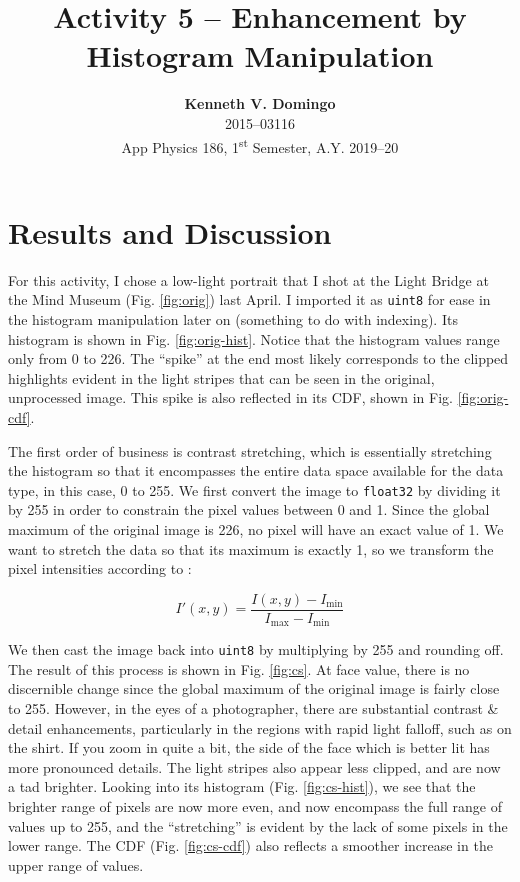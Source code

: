 \documentclass[12pt,a4paper]{article}
\begin{document}
\title{\TitleFont Activity 5 -- Enhancement by Histogram Manipulation}
\author[ ]{\textbf{Kenneth V. Domingo} \\
2015--03116 \\
App Physics 186, 1\textsuperscript{st} Semester, A.Y. 2019--20}

\maketitle
\thispagestyle{titlestyle}

\section*{Results and Discussion}
\setcounter{section}{1}

For this activity, I chose a low-light portrait that I shot at the Light Bridge at the Mind Museum (Fig. \ref{fig:orig}) last April. I imported it as \texttt{uint8} for ease in the histogram manipulation later on (something to do with indexing). Its histogram is shown in Fig. \ref{fig:orig-hist}. Notice that the histogram values range only from 0 to 226. The ``spike'' at the end most likely corresponds to the clipped highlights evident in the light stripes that can be seen in the original, unprocessed image. This spike is also reflected in its CDF, shown in Fig. \ref{fig:orig-cdf}.

The first order of business is contrast stretching, which is essentially stretching the histogram so that it encompasses the entire data space available for the data type, in this case, 0 to 255. We first convert the image to \texttt{float32} by dividing it by 255 in order to constrain the pixel values between 0 and 1. Since the global maximum of the original image is 226, no pixel will have an exact value of 1. We want to stretch the data so that its maximum is exactly 1, so we transform the pixel intensities according to \cite{soriano}:

\begin{equation}\label{eq:constrast-stretch}
	I'(x,y) = \frac{I(x,y) - I_{\min}}{I_{\max} - I_{\min}}
\end{equation}

We then cast the image back into \texttt{uint8} by multiplying by 255 and rounding off. The result of this process is shown in Fig. \ref{fig:cs}. At face value, there is no discernible change since the global maximum of the original image is fairly close to 255. However, in the eyes of a photographer, there are substantial contrast \& detail enhancements, particularly in the regions with rapid light falloff, such as on the shirt. If you zoom in quite a bit, the side of the face which is better lit has more pronounced details. The light stripes also appear less clipped, and are now a tad brighter. Looking into its histogram (Fig. \ref{fig:cs-hist}), we see that the brighter range of pixels are now more even, and now encompass the full range of values up to 255, and the ``stretching'' is evident by the lack of some pixels in the lower range. The CDF (Fig. \ref{fig:cs-cdf}) also reflects a smoother increase in the upper range of values.
\end{document}
